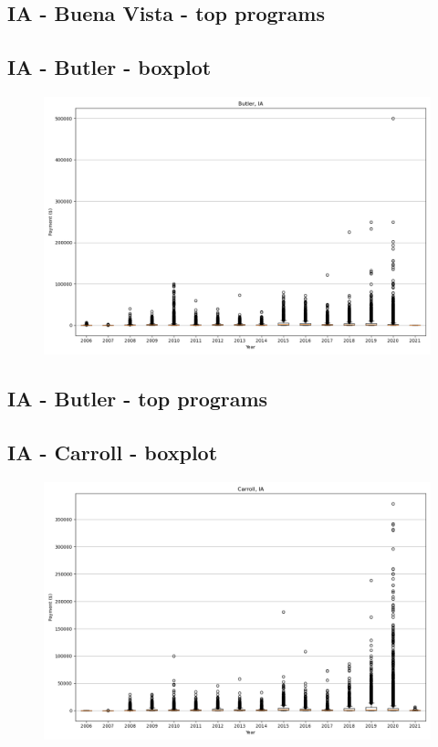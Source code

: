 \subsection*{IA - Buena Vista - top programs}

\newpage
\subsection*{IA - Butler - boxplot}
\begin{figure}[h]
\centering
\includegraphics[width=7in]{../output/boxplots/counties/Butler-IA_boxplot.png}
\end{figure}


\subsection*{IA - Butler - top programs}

\newpage
\subsection*{IA - Carroll - boxplot}
\begin{figure}[h]
\centering
\includegraphics[width=7in]{../output/boxplots/counties/Carroll-IA_boxplot.png}
\end{figure}


